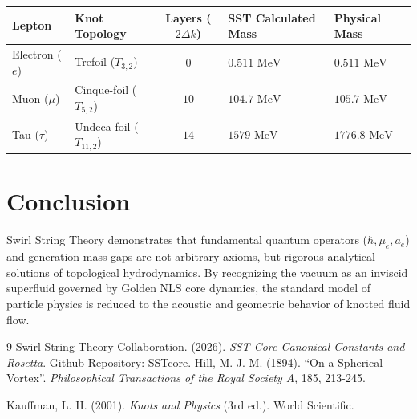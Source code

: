 \documentclass[11pt]{article}
\begin{document}
            \begin{table}[h]
                \centering
                \begin{tabular}{@{}llcll@{}}
                    \toprule
                    \textbf{Lepton} & \textbf{Knot Topology} & \textbf{Layers ($2\Delta k$)} & \textbf{SST Calculated Mass} & \textbf{Physical Mass} \\ \midrule
                    Electron ($e$) & Trefoil ($T_{3,2}$) & $0$ & $0.511 \text{ MeV}$ & $0.511 \text{ MeV}$ \\
                    Muon ($\mu$) & Cinque-foil ($T_{5,2}$) & $10$ & $104.7 \text{ MeV}$ & $105.7 \text{ MeV}$ \\
                    Tau ($\tau$) & Undeca-foil ($T_{11,2}$) & $14$ & $1579 \text{ MeV}$ & $1776.8 \text{ MeV}$ \\ \bottomrule
                \end{tabular}
            \end{table}

    \section{Conclusion}
        Swirl String Theory demonstrates that fundamental quantum operators ($\hbar, \mu_e, a_e$) and generation mass gaps are not arbitrary axioms, but rigorous analytical solutions of topological hydrodynamics. By recognizing the vacuum as an inviscid superfluid governed by Golden NLS core dynamics, the standard model of particle physics is reduced to the acoustic and geometric behavior of knotted fluid flow.

        \begin{thebibliography}{9}
            Swirl String Theory Collaboration. (2026). \textit{SST Core Canonical Constants and Rosetta}. Github Repository: SSTcore.
            Hill, M. J. M. (1894). ``On a Spherical Vortex''. \textit{Philosophical Transactions of the Royal Society A}, 185, 213-245.

            Kauffman, L. H. (2001). \textit{Knots and Physics} (3rd ed.). World Scientific.
        \end{thebibliography}
\end{document}
